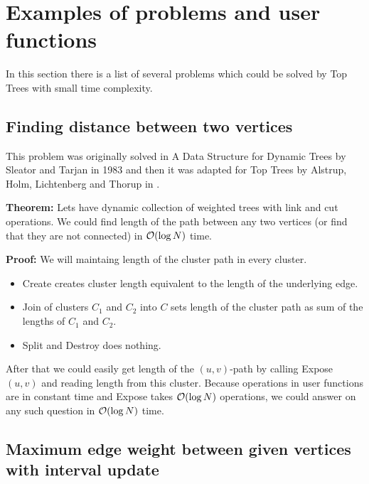 \chapter{Examples of problems and user functions}

In this section there is a list of several problems which could be solved by
Top Trees with small time complexity.

\section{Finding distance between two vertices}

This problem was originally solved in {\I A Data Structure for Dynamic Trees}
\cite{DSforDynamicTrees} by Sleator and Tarjan in 1983 and then it was adapted
for Top Trees by Alstrup, Holm, Lichtenberg and Thorup in \cite{TopTrees}.

{\bf Theorem:} Lets have dynamic collection of weighted trees with link and cut
operations. We could find length of the path between any two vertices (or find
that they are not connected) in ${\cal O}(\log N)$ time.

\medskip\noindent
{\bf Proof:} We will maintaing length of the cluster path in every cluster.

\begin{itemize}

\item {\sc Create} creates cluster length equivalent to the length of the
underlying edge.

\item {\sc Join} of clusters $C_1$ and $C_2$ into $C$ sets length of the cluster
path as sum of the lengths of $C_1$ and $C_2$.

\item {\sc Split} and {\sc Destroy} does nothing.

\end{itemize}

After that we could easily get length of the $(u,v)$-path by calling
{\sc Expose}$(u,v)$ and reading length from this cluster. Because operations
in user functions are in constant time and {\sc Expose} takes ${\cal O}(\log N)$
operations, we could answer on any such question in ${\cal O}(\log N)$ time.


\section{Maximum edge weight between given vertices with interval update}

